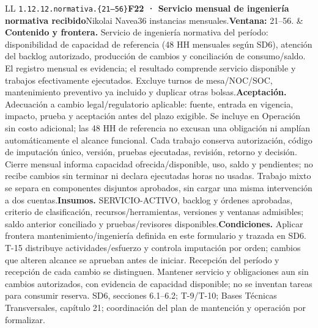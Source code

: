 \begin{longtable}{L{\tabcolsep\relax}L{\tabcolsep\relax}}
\texttt{1.\allowbreak{}12.\allowbreak{}12.\allowbreak{}normativa.\allowbreak{}\{21--56\}}\newline{}\textbf{F22 · Servicio mensual de ingeniería normativa recibido}\newline{}Nikolai Navea\newline{}36 instancias mensuales.\newline{}\textbf{Ventana:} 21--56. & \textbf{Contenido y frontera.} Servicio de ingeniería normativa del período: disponibilidad de capacidad de referencia (48 HH mensuales según SD6), atención del backlog autorizado, producción de cambios y conciliación de consumo/saldo. El registro mensual es evidencia; el resultado comprende servicio disponible y trabajos efectivamente ejecutados. Excluye turnos de mesa/NOC/SOC, mantenimiento preventivo ya incluido y duplicar otras bolsas.\newline{}\textbf{Aceptación.} Adecuación a cambio legal/regulatorio aplicable: fuente, entrada en vigencia, impacto, prueba y aceptación antes del plazo exigible. Se incluye en Operación sin costo adicional; las 48 HH de referencia no excusan una obligación ni amplían automáticamente el alcance funcional. Cada trabajo conserva autorización, código de imputación único, versión, pruebas ejecutadas, revisión, retorno y decisión. Cierre mensual informa capacidad ofrecida/disponible, uso, saldo y pendientes; no recibe cambios sin terminar ni declara ejecutadas horas no usadas. Trabajo mixto se separa en componentes disjuntos aprobados, sin cargar una misma intervención a dos cuentas.\newline{}\textbf{Insumos.} SERVICIO-ACTIVO, backlog y órdenes aprobadas, criterio de clasificación, recursos/herramientas, versiones y ventanas admisibles; saldo anterior conciliado y pruebas/revisores disponibles.\newline{}\textbf{Condiciones.} Aplicar frontera mantenimiento/ingeniería definida en este formulario y trazada en SD6. T-15 distribuye actividades/esfuerzo y controla imputación por orden; cambios que alteren alcance se aprueban antes de iniciar. Recepción del período y recepción de cada cambio se distinguen. Mantener servicio y obligaciones aun sin cambios autorizados, con evidencia de capacidad disponible; no se inventan tareas para consumir reserva. SD6, secciones 6.1--6.2; T-9/T-10; Bases Técnicas Transversales, capítulo 21; coordinación del plan de mantención y operación por formalizar.\\\hline

\end{longtable}

